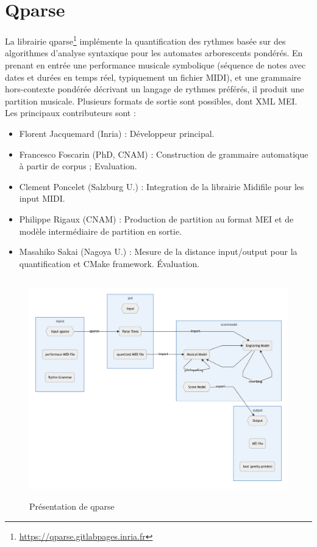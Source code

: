 \section{Qparse}
La librairie qparse\footnote{\url{https://qparse.gitlabpages.inria.fr}} implémente la quantification des rythmes basée sur des algorithmes d'analyse syntaxique pour les automates arborescents pondérés. En prenant en entrée une performance musicale symbolique (séquence de notes avec dates et durées en temps réel, typiquement un fichier MIDI), et une grammaire hors-contexte pondérée décrivant un langage de rythmes préférés, il produit une partition musicale. Plusieurs formats de sortie sont possibles, dont XML MEI.
Les principaux contributeurs sont :
\begin{itemize}
	\item Florent Jacquemard (Inria) : Développeur principal.
	\item Francesco Foscarin (PhD, CNAM) : Construction de grammaire automatique à partir de corpus ; Evaluation.
	\item Clement Poncelet (Salzburg U.) : Integration de la librairie Midifile pour les input MIDI.
	\item Philippe Rigaux (CNAM) : Production de partition au format MEI et de modèle intermédiaire de partition en sortie.
	\item Masahiko Sakai (Nagoya U.) : Mesure de la distance input/output pour la quantification et CMake framework. Évaluation.
\end{itemize}
\begin{figure}[h]
	\centering
	\includegraphics[height=95mm, width=130mm]{z_images/3_methodes/1_qparse/0_general_qparse.png}
	\caption{Présentation de qparse}
	\label{presentation_qparse}
\end{figure}
